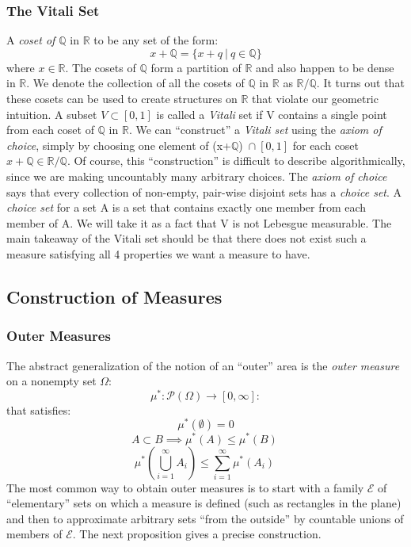 \documentclass{article}
\begin{document}
\subsubsection{The Vitali Set}
A \emph{coset of $\mathbb{Q}$} in $\mathbb{R}$ to be any set of the form:
\[
x+\mathbb{Q}=\{x+q\ | \ q \in \mathbb{Q}\}
\]
where $x\in \mathbb{R}$. The cosets of $\mathbb{Q}$ form a partition of $\mathbb{R}$ and also happen to be dense in $\mathbb{R}$. We denote the collection of all the cosets of \textit{$\mathbb{Q}$} in $\mathbb{R}$ as $\mathbb{R}/\mathbb{Q}$. It turns out that these cosets can be used to create structures on $\mathbb{R}$ that violate our geometric intuition. \newline \newline 
A subset $V\subset[0,1]$ is called a \emph{Vitali} set if V contains a single point from each coset of \textit{$\mathbb{Q}$} in $\mathbb{R}$. We can ``construct'' a \emph{Vitali set} using the \emph{axiom of choice}, simply by choosing one element of (x+$\mathbb{Q}$)\ $\cap \ [0,1]$ for each coset $x+\mathbb{Q} \in\mathbb{R}/ \mathbb{Q.}$ Of course, this “construction” is difficult to describe algorithmically, since we are making uncountably many arbitrary choices. \newline \newline 
The \emph{axiom of choice} says that every collection of non-empty, pair-wise disjoint sets has a \emph{choice set}. A \emph{choice set} for a set A is a set that contains exactly one member from each member of A.\newline \newline 
We will take it as a fact that V is not Lebesgue measurable. The main takeaway of the Vitali set should be that there does not exist such a measure satisfying all 4 properties we want a measure to have.
\subsection{Construction of Measures}

\subsubsection{Outer Measures}
The abstract generalization of the notion of an ``outer'' area is the \emph{outer measure} on a nonempty set $\Omega$: 
\[
\mu^*:\mathcal{P}(\Omega)\to[0,\infty]:
\]
that satisfies:
\[
\mu^*(\emptyset)
=0\]
\[
A \subset B \implies\mu^*(A)\leq\mu^*(B)\
\]
\[
\mu^*(\bigcup_{i=1}^{\infty}A_i)\leq \sum_{i=1}^{\infty}\mu^*(A_i)\
\]
The most common way to obtain outer measures is to start with a family $\mathcal{E}$ of ``elementary'' sets on which a measure is defined (such as rectangles in the plane) and then to approximate arbitrary sets ``from the outside'' by countable unions of members of $\mathcal{E}$. The next proposition gives a precise construction. 
\end{document}
